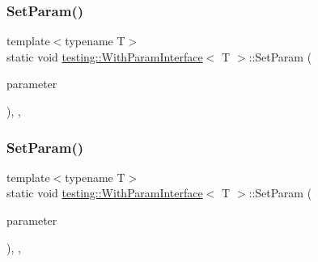 \mbox{\label{classtesting_1_1_with_param_interface_a471e12a61e83347675b649465bc5aabc}} 
\subsubsection{\texorpdfstring{SetParam()}{SetParam()}\hspace{0.1cm}{\footnotesize\ttfamily [2/3]}}
{\footnotesize\ttfamily template$<$typename T$>$ \\
static void \mbox{\hyperlink{classtesting_1_1_with_param_interface}{testing\+::\+With\+Param\+Interface}}$<$ T $>$\+::Set\+Param (\begin{DoxyParamCaption}\item[{const \mbox{\hyperlink{classtesting_1_1_with_param_interface_a343febaaebf1f025bda484f841d4fec1}{Param\+Type}} $\ast$}]{parameter }\end{DoxyParamCaption})\hspace{0.3cm}{\ttfamily [inline]}, {\ttfamily [static]}, {\ttfamily [private]}}

\mbox{\label{classtesting_1_1_with_param_interface_a471e12a61e83347675b649465bc5aabc}} 
\subsubsection{\texorpdfstring{SetParam()}{SetParam()}\hspace{0.1cm}{\footnotesize\ttfamily [3/3]}}
{\footnotesize\ttfamily template$<$typename T$>$ \\
static void \mbox{\hyperlink{classtesting_1_1_with_param_interface}{testing\+::\+With\+Param\+Interface}}$<$ T $>$\+::Set\+Param (\begin{DoxyParamCaption}\item[{const \mbox{\hyperlink{classtesting_1_1_with_param_interface_a343febaaebf1f025bda484f841d4fec1}{Param\+Type}} $\ast$}]{parameter }\end{DoxyParamCaption})\hspace{0.3cm}{\ttfamily [inline]}, {\ttfamily [static]}, {\ttfamily [private]}}



